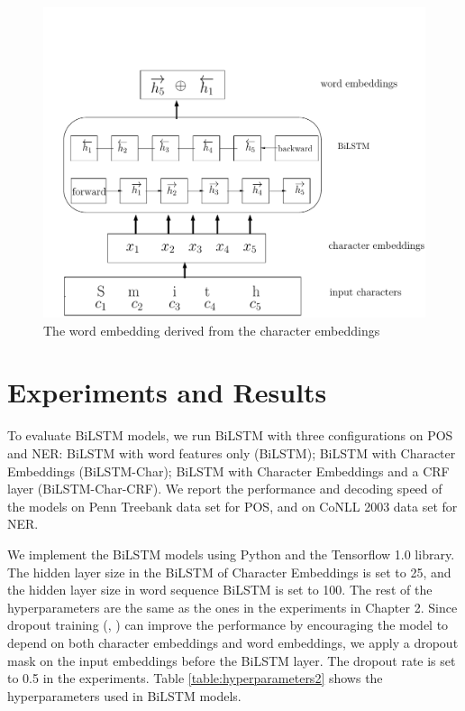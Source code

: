 \begin{figure}
  \centering
  \includegraphics[scale=0.6]{bilstmchar.pdf}
 \caption{The word embedding derived from the character embeddings}
  \label{fig:charlstm}
\end{figure}


 
\section{Experiments and Results}

To evaluate BiLSTM models, we run BiLSTM with three configurations on POS and NER: BiLSTM with word features only (BiLSTM); BiLSTM with Character Embeddings (BiLSTM-Char); BiLSTM with Character Embeddings and a CRF layer (BiLSTM-Char-CRF). We report the performance and decoding speed of the models on Penn Treebank data set for POS, and on CoNLL 2003 data set for NER. 

We implement the BiLSTM models using Python and the Tensorflow 1.0 library. The hidden layer size in the BiLSTM of Character Embeddings is set to 25, and the hidden layer size in word sequence BiLSTM is set to 100. The rest of the hyperparameters are the same as the ones in the experiments in Chapter 2. Since dropout training (\citeauthor{hinton2012improving}, \citeyear{hinton2012improving}) can improve the performance by encouraging the model to depend on both character embeddings and word embeddings, we apply a dropout mask on the input embeddings before the BiLSTM layer. The dropout rate is set to 0.5 in the experiments. Table \ref{table:hyperparameters2} shows the hyperparameters used in BiLSTM models.

